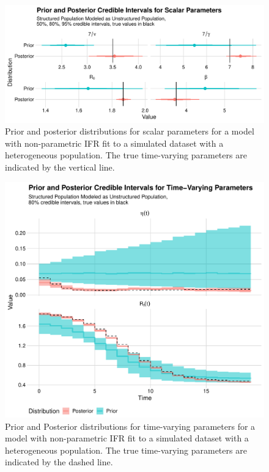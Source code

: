 \begin{figure}[htbp]
    \centering
    \includegraphics[width=0.75\columnwidth]{ifr_age_structure_generated_quantities_simulation_scalar_plot}
    \caption{Prior and posterior distributions for scalar parameters for a model with non-parametric IFR fit to a simulated dataset with a heterogeneous population.
    The true time-varying parameters are indicated by the vertical line.}
    \label{ch_4:fig:ifr_age_structure_generated_quantities_simulation_scalar_plot}
\end{figure}

\begin{figure}[htbp]
    \centering
    \includegraphics[width=0.75\columnwidth]{ifr_age_structure_generated_quantities_simulation_time_varying_plot}
    \caption{Prior and Posterior distributions for time-varying parameters for a model with non-parametric IFR fit to a simulated dataset with a heterogeneous population.
    The true time-varying parameters are indicated by the dashed line.}
    \label{ch_4:fig:ifr_age_structure_generated_quantities_simulation_time_varying_plot}
\end{figure}

